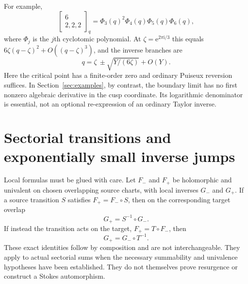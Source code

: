 \documentclass[11pt,a4paper]{article}
\numberwithin{equation}{section}
\theoremstyle{definition}\newtheorem{definition}[theorem]{Definition}
\theoremstyle{remark}\newtheorem{remark}[theorem]{Remark}
\newcommand{\ii}{\mathrm i}\newcommand{\e}{\mathrm e}
\begin{document}
For example,
\begin{equation}\label{eq:finite-example}
 \begin{bmatrix}6\\2,2,2\end{bmatrix}_q
   =\Phi_3(q)^2\Phi_4(q)\Phi_5(q)\Phi_6(q),
\end{equation}
where $\Phi_j$ is the $j$th cyclotomic polynomial. At
$\zeta=\e^{2\pi\ii/3}$ this equals
$6\zeta(q-\zeta)^2+O((q-\zeta)^3)$, and the inverse branches are
\[
 q=\zeta\ \pm\sqrt{Y/(6\zeta)}+O(Y).
\]
Here the critical point has a finite-order zero and ordinary Puiseux
reversion suffices. In Section~\ref{sec:examples}, by contrast, the
boundary limit has no first nonzero algebraic derivative in the cusp
coordinate. Its logarithmic denominator is essential, not an optional
re-expression of an ordinary Taylor inverse.

\section{Sectorial transitions and exponentially small inverse jumps}
\label{sec:jumps}
Local formulas must be glued with care. Let $F_-$ and $F_+$ be
holomorphic and univalent on chosen overlapping source charts, with
local inverses $G_-$ and $G_+$. If a source transition $S$ satisfies
$F_+=F_-\circ S$, then on the corresponding target overlap
\begin{equation}\label{eq:source-transition}
 G_+=S^{-1}\circ G_-.
\end{equation}
If instead the transition acts on the target, $F_+=T\circ F_-$, then
\begin{equation}\label{eq:target-transition}
 G_+=G_-\circ T^{-1}.
\end{equation}
These exact identities follow by composition and are not interchangeable.
They apply to actual sectorial sums when the necessary summability and
univalence hypotheses have been established. They do not themselves
prove resurgence or construct a Stokes automorphism.
\end{document}
